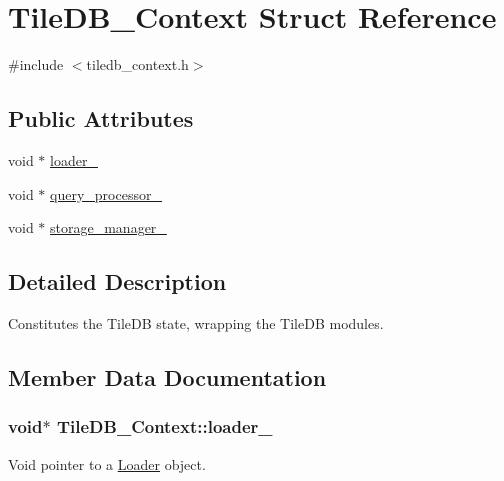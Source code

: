 \hypertarget{structTileDB__Context}{}\section{Tile\+D\+B\+\_\+\+Context Struct Reference}
\label{structTileDB__Context}


{\ttfamily \#include $<$tiledb\+\_\+context.\+h$>$}

\subsection*{Public Attributes}
\begin{DoxyCompactItemize}
\item 
void $\ast$ \hyperlink{structTileDB__Context_a7902a77357ee82566cdc6158b217a6a3}{loader\+\_\+}
\item 
void $\ast$ \hyperlink{structTileDB__Context_ae1f0cb3f7f12d72aee268bc23aeff5a3}{query\+\_\+processor\+\_\+}
\item 
void $\ast$ \hyperlink{structTileDB__Context_a22167896c250fe3eee8746b151c76c5e}{storage\+\_\+manager\+\_\+}
\end{DoxyCompactItemize}


\subsection{Detailed Description}
Constitutes the Tile\+D\+B state, wrapping the Tile\+D\+B modules. 

\subsection{Member Data Documentation}
\hypertarget{structTileDB__Context_a7902a77357ee82566cdc6158b217a6a3}{}
\subsubsection[{loader\+\_\+}]{\setlength{\rightskip}{0pt plus 5cm}void$\ast$ Tile\+D\+B\+\_\+\+Context\+::loader\+\_\+}\label{structTileDB__Context_a7902a77357ee82566cdc6158b217a6a3}
Void pointer to a \hyperlink{classLoader}{Loader} object. \hypertarget{structTileDB__Context_ae1f0cb3f7f12d72aee268bc23aeff5a3}{}
